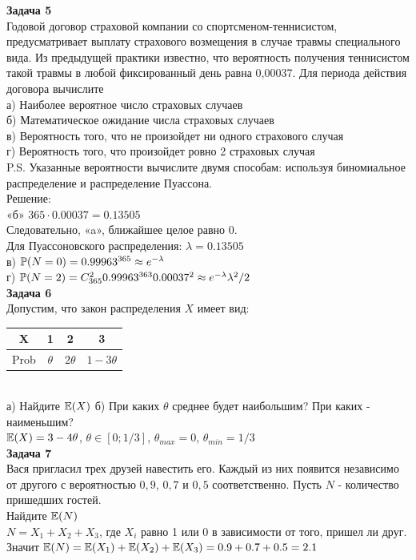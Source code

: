 \documentclass[12pt, a4paper]{article}\usepackage[]{graphicx}\usepackage[]{color}
\begin{document}
	\textbf{Задача 5} \\ %
	Годовой договор страховой компании со спортсменом-теннисистом, предусматривает выплату страхового возмещения  в случае травмы специального вида. Из предыдущей практики известно, что вероятность получения теннисистом такой травмы  в любой фиксированный день равна 0,00037. Для периода действия договора вычислите \\
	а) Наиболее вероятное число страховых случаев  \\
	б) Математическое ожидание числа страховых случаев \\
	в) Вероятность того, что не произойдет ни одного страхового случая \\
	г) Вероятность того, что произойдет ровно 2 страховых случая \\
	P.S. Указанные вероятности вычислите двумя способам: используя биномиальное распределение и распределение Пуассона.\\
	Решение: \\
	«б» $365\cdot 0.00037=0.13505$ \\
	Следовательно, «a», ближайшее целое равно 0. \\
	Для Пуассоновского распределения: $\lambda=0.13505$ \\
	в) $\P(N=0)=0.99963^{365}\approx e^{-\lambda}$ \\
	г) $\P(N=2)=C_{365}^{2}0.99963^{363}0.00037^{2}\approx e^{-\lambda}\lambda^{2}/2$ \\


	\textbf{Задача 6} \\ %
	Допустим, что закон распределения $X$ имеет вид:
	\begin{tabular}{c|ccc}
		X & 1 & 2 & 3 \\
		\hline
		Prob & $\theta$ & $2\theta$ & $1-3\theta$ \\
	\end{tabular} \\
	а) Найдите $\E(X)$ %
	б) При каких $\theta$ среднее будет наибольшим? При каких - наименьшим? \\
	$\E(X)=3-4\theta$, $\theta\in[0;1/3]$, $\theta_{max}=0$, $\theta_{min}=1/3$ \\


	\textbf{Задача 7} \\ %
	Вася пригласил трех друзей навестить его. Каждый из них появится
	независимо от другого с вероятностью $0,9$, $0,7$ и $0,5$
	соответственно. Пусть $N$ - количество пришедших гостей. \\
	Найдите $\E(N)$ \\
	$N=X_{1}+X_{2}+X_{3}$, где $X_{i}$ равно 1 или 0 в зависимости от того, пришел ли друг. Значит $\E(N)=\E(X_{1})+\E(X_{2})+\E(X_{3})=0.9+0.7+0.5=2.1$ \\
\end{document}
